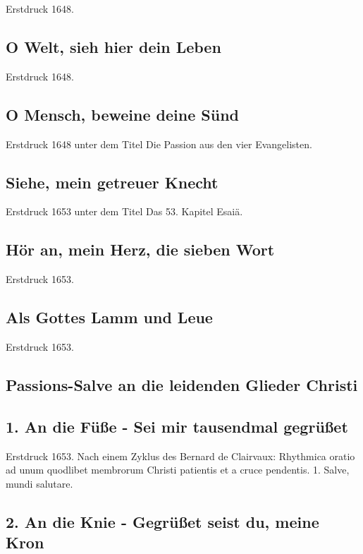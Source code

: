 Erstdruck 1648.

\subsection*{ O Welt, sieh hier dein Leben}

Erstdruck 1648.

\subsection*{ O Mensch, beweine deine Sünd}

Erstdruck 1648 unter dem Titel \frqq Die Passion aus den vier Evangelisten\flqq .

\subsection*{ Siehe, mein getreuer Knecht}

Erstdruck 1653 unter dem Titel \frqq Das 53. Kapitel Esaiä\flqq .

\subsection*{ Hör an, mein Herz, die sieben Wort}

Erstdruck 1653.

\subsection*{ Als Gottes Lamm und Leue}

Erstdruck 1653.

\subsection*{ Passions-Salve an die leidenden Glieder Christi}

\subsection*{ 1. An die Füße - Sei mir tausendmal gegrüßet}

Erstdruck 1653. Nach einem Zyklus des Bernard de Clairvaux: \frqq Rhythmica
oratio ad unum quodlibet membrorum Christi patientis et a cruce
pendentis. 1. Salve, mundi salutare\flqq .

\subsection*{ 2. An die Knie - Gegrüßet seist du, meine Kron}

